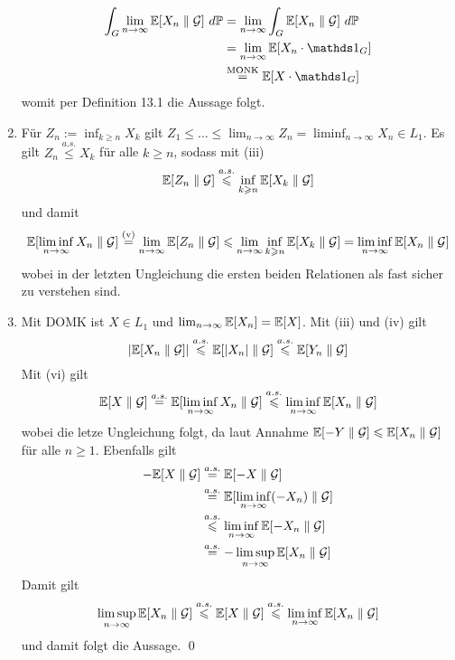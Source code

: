 \documentclass[11pt]{report}
\begin{document}
\begin{enumerate}[label=(\roman*)]
         \begin{align*}
             \int_G\lim_{n\to\infty}\E[X_n\parallel\G]\ d\Pp&=\lim_{n\to\infty}\int_G\E[X_n\parallel\G]\ d\Pp\\
             &=\lim_{n\to\infty}\E[X_n\cdot\ind{G}]\\
             &\overset{\text{MONK}}{=}\E[X\cdot\ind{G}]
         \end{align*}
         womit per Definition 13.1 die Aussage folgt.
         \item Für $Z_n:=\inf_{k\geq n}X_k$ gilt $Z_1\leq\hdots\leq\lim_{n\to\infty}Z_n=\liminf_{n\to\infty}X_n\in L_1$. Es gilt $Z_n\overset{a.s.}{\leq}X_k$ für alle $k\geq n$, sodass mit (iii)
         $$\mathbb{E}[Z_n\parallel\mathcal{G}]\overset{a.s.}{\leqslant}\inf_{k\geqslant n}\mathbb{E}[X_k\parallel\mathcal{G}]$$
         und damit
         \begin{align*}
             \mathbb{E}[\liminf_{n\to\infty}X_n\parallel\mathcal{G}]\overset{\text{(v)}}{=}\lim_{n\to\infty}\mathbb{E}[Z_n\parallel\mathcal{G}]\leqslant\lim_{n\to\infty}\inf_{k\geqslant n}\mathbb{E}[X_k\parallel\mathcal{G}]=\liminf_{n\to\infty}\mathbb{E}[X_n\parallel\mathcal{G}]
         \end{align*} 
         wobei in der letzten Ungleichung die ersten beiden Relationen als fast sicher zu verstehen sind.
         \item Mit DOMK ist $X\in L_1$ und $\lim_{n\to\infty}\mathbb{E}[X_n]=\mathbb{E}[X]$. Mit (iii) und (iv) gilt 
         $$|\mathbb{E}[X_n\parallel\mathcal{G}]|\overset{a.s.}{\leqslant}\mathbb{E}[|X_n|\parallel\mathcal{G}]\overset{a.s.}{\leqslant}\mathbb{E}[Y_n\parallel\mathcal{G}]$$
         Mit (vi) gilt
         $$\mathbb{E}[X\parallel\mathcal{G}]\overset{a.s.}{=}\mathbb{E}[\liminf_{n\to\infty}X_n\parallel\mathcal{G}]\overset{a.s.}{\leqslant}\liminf_{n\to\infty}\mathbb{E}[X_n\parallel\mathcal{G}]$$
         wobei die letze Ungleichung folgt, da laut Annahme $\mathbb{E}[-Y\parallel\mathcal{G}]\leqslant\mathbb{E}[X_n\parallel\mathcal{G}]$ für alle $n\geq1$. Ebenfalls gilt
         \begin{align*}
             -\mathbb{E}[X\parallel\mathcal{G}]&\overset{a.s.}{=}\mathbb{E}[-X\parallel\mathcal{G}]\\
             &\overset{a.s.}{=}\mathbb{E}[\liminf_{n\to\infty}(-X_n)\parallel\mathcal{G}]\\
             &\overset{a.s.}{\leqslant}\liminf_{n\to\infty}\mathbb{E}[-X_n\parallel\mathcal{G}]\\
             &\overset{a.s.}{=}-\limsup_{n\to\infty}\mathbb{E}[X_n\parallel\mathcal{G}]
         \end{align*}
         Damit gilt 
         $$\limsup_{n\to\infty}\mathbb{E}[X_n\parallel\mathcal{G}]\overset{a.s.}{\leqslant}\mathbb{E}[X\parallel\mathcal{G}]\overset{a.s.}{\leqslant}\liminf_{n\to\infty}\mathbb{E}[X_n\parallel\mathcal{G}]$$
         und damit folgt die Aussage. \qed
     \end{enumerate}
     
\end{document}
